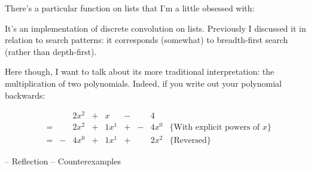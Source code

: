 \documentclass{article}
\begin{document}
There's a particular function on lists that I'm a little obsessed with:


It's an implementation of discrete convolution on lists. Previously I discussed it in relation to search patterns: it corresponds (somewhat) to breadth-first search (rather than depth-first).

Here though, I want to talk about its more traditional interpretation: the
multiplication of two polynomials. Indeed, if you write out your polynomial
backwards: 

\begin{align}
&   &   & 2x^2 & + & x    & - &   & 4    & \\
& = &   & 2x^2 & + & 1x^1 & + & - & 4x^0 &  \{ \text{With explicit powers of $x$} \} \\
& = & - & 4x^0 & + & 1x^1 & + &   & 2x^2 & \{ \text{Reversed} \}
\end{align}

-- Reflection
-- Counterexamples











\end{document}
